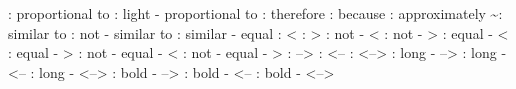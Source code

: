 \propto : proportional to 
\varpropto : light - proportional to 
\therefore: therefore
\because: because
\aprox : approximately
\sim : similar to
\nsim : not - similar to
\simeq : similar - equal
\less : <
\gtr : >
\nless : not - <
\ngtr : not - >
\leqslant : equal - <
\geqslant : equal - >
\nleqslant : not - equal - <
\ngeqslant : not - equal - >
\leftarrow : -->
\rightarrow : <--
\lefrighttarrow : <-->
\longleftarrow : long - -->
\longrightarrow : long - <--
\longlefrighttarrow : long - <-->
\Leftarrow : bold - -->
\Rightarrow : bold - <--
\Lefrighttarrow : bold - <-->